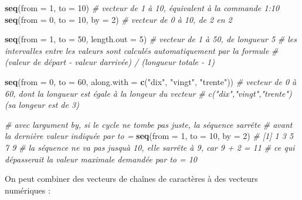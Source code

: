 \documentclass[
]{book}
\newenvironment{Shaded}{\begin{snugshade}}{\end{snugshade}}
\newcommand{\AttributeTok}[1]{\textcolor[rgb]{0.13,0.29,0.53}{#1}}
\newcommand{\CommentTok}[1]{\textcolor[rgb]{0.56,0.35,0.01}{\textit{#1}}}
\newcommand{\DecValTok}[1]{\textcolor[rgb]{0.00,0.00,0.81}{#1}}
\newcommand{\FunctionTok}[1]{\textcolor[rgb]{0.13,0.29,0.53}{\textbf{#1}}}
\newcommand{\NormalTok}[1]{#1}
\newcommand{\StringTok}[1]{\textcolor[rgb]{0.31,0.60,0.02}{#1}}
\begin{document}
\begin{Shaded}
\begin{Highlighting}[]
\FunctionTok{seq}\NormalTok{(}\AttributeTok{from =} \DecValTok{1}\NormalTok{, }\AttributeTok{to =} \DecValTok{10}\NormalTok{) }\CommentTok{\# vecteur de 1 à 10, équivalent à la commande 1:10}
\FunctionTok{seq}\NormalTok{(}\AttributeTok{from =} \DecValTok{0}\NormalTok{, }\AttributeTok{to =} \DecValTok{10}\NormalTok{, }\AttributeTok{by =} \DecValTok{2}\NormalTok{) }\CommentTok{\# vecteur de 0 à 10, de 2 en 2}

\FunctionTok{seq}\NormalTok{(}\AttributeTok{from =} \DecValTok{1}\NormalTok{, }\AttributeTok{to =} \DecValTok{50}\NormalTok{, }\AttributeTok{length.out =} \DecValTok{5}\NormalTok{) }\CommentTok{\# vecteur de 1 à 50, de longueur 5}
\CommentTok{\# les intervalles entre les valeurs sont calculés automatiquement par la formule}
\CommentTok{\# (valeur de départ {-} valeur d\textquotesingle{}arrivée) / (longueur totale {-} 1)}

\FunctionTok{seq}\NormalTok{(}\AttributeTok{from =} \DecValTok{0}\NormalTok{, }\AttributeTok{to =} \DecValTok{60}\NormalTok{, }\AttributeTok{along.with =} \FunctionTok{c}\NormalTok{(}\StringTok{"dix"}\NormalTok{, }\StringTok{"vingt"}\NormalTok{, }\StringTok{"trente"}\NormalTok{))}
\CommentTok{\# vecteur de 0 à 60, dont la longueur est égale à la longeur du vecteur}
\CommentTok{\# c("dix","vingt","trente") (sa longeur est de 3)}

\CommentTok{\# avec l\textquotesingle{}argument \textquotesingle{}by\textquotesingle{}, si le cycle ne tombe pas juste, la séquence s\textquotesingle{}arrête }
\CommentTok{\# avant la dernière valeur indiquée par \textquotesingle{}to = \textquotesingle{}}
\FunctionTok{seq}\NormalTok{(}\AttributeTok{from =} \DecValTok{1}\NormalTok{, }\AttributeTok{to =} \DecValTok{10}\NormalTok{, }\AttributeTok{by =} \DecValTok{2}\NormalTok{)}
\CommentTok{\# [1] 1 3 5 7 9}
\CommentTok{\# la séquence ne va pas jusqu\textquotesingle{}à 10, elle s\textquotesingle{}arrête à 9, car 9 + 2 = 11}
\CommentTok{\# ce qui dépasserait la valeur maximale demandée par \textquotesingle{}to = 10\textquotesingle{}}
\end{Highlighting}
\end{Shaded}

On peut combiner des vecteurs de chaînes de caractères à des vecteurs numériques :
\end{document}
